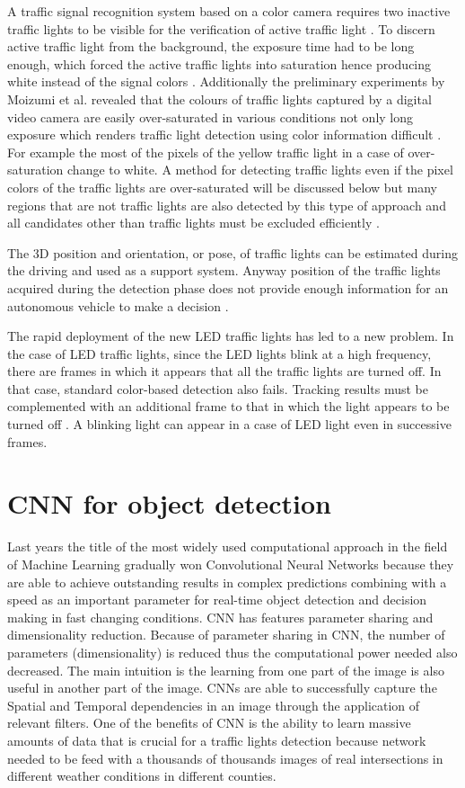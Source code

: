 \documentclass[letterpaper, 10 pt, conference]{ieeeconf} %
\begin{document}
A traffic signal recognition system based on a color camera requires two inactive traffic lights to be visible for the verification of active traffic light \cite{c6}. To discern active traffic light from the background, the exposure time had to be long enough, which forced the active traffic lights into saturation hence producing white instead of the signal colors \cite{c6}. Additionally the preliminary experiments by Moizumi et al. revealed that the colours of traffic lights captured by a digital video camera are easily over-saturated in various conditions not only long exposure which renders traffic light detection using color information difficult \cite{c3}. For example the most of the pixels of the yellow traffic light in a case of over-saturation change to white. A method for detecting traffic lights even if the pixel colors of the traffic lights are over-saturated will be discussed below but many regions that are not traffic lights are also detected by this type of approach and all candidates other than traffic lights must be excluded efficiently \cite{c3}.

The 3D position and orientation, or pose, of traffic lights can be estimated during the driving and used as a support system. Anyway position of the traffic lights acquired during the detection phase does not provide enough information for an autonomous vehicle to make a decision \cite{c7}.

The rapid deployment of the new LED traffic lights has led to a new problem. In the case of LED traffic lights, since the LED lights blink at a high frequency, there are frames in which it appears that all the traffic lights are turned off. In that case, standard color-based detection also fails. Tracking results must be complemented with an additional frame to that in which the light appears to be turned off \cite{c3}. A blinking light can appear in a case of LED light even in successive frames.


\section{CNN for object detection}
Last years the title of the most widely used computational approach in the field of Machine Learning gradually won Convolutional Neural Networks because they are able to achieve outstanding results in complex predictions combining with a speed as an important parameter for real-time object detection and decision making in fast changing conditions. CNN has features parameter sharing and dimensionality reduction. Because of parameter sharing in CNN, the number of parameters (dimensionality) is reduced thus the computational power needed also decreased. The main intuition is the learning from one part of the image is also useful in another part of the image. CNNs are able to successfully capture the Spatial and Temporal dependencies in an image through the application of relevant filters. One of the benefits of CNN is the ability to learn massive amounts of data that is crucial for a traffic lights detection because network needed to be feed with a thousands of thousands images of real intersections in different weather conditions in different counties.
\end{document}
